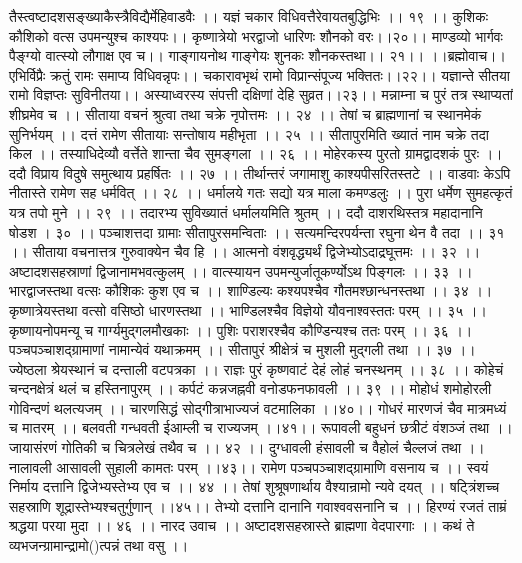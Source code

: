 तैस्त्वष्टादशसङ्ख्याकैस्त्रैविद्यैर्मेहिवाडवैः ।।
यज्ञं चकार विधिवत्तैरेवायतबुद्धिभिः ।। १९ ।।
कुशिकः कौशिको वत्स उपमन्युश्च काश्यपः।।
कृष्णात्रेयो भरद्वाजो धारिणः शौनको वरः।।२०।।
माण्डव्यो भार्गवः पैङ्ग्यो वात्स्यो लौगाक्ष एव च।।
गाङ्गायनोथ गाङ्गेयः शुनकः शौनकस्तथा।। २१।।
।।ब्रह्मोवाच।।
एभिर्विप्रैः क्रतुं रामः समाप्य विधिवन्नृपः।।
चकारावभृथं रामो विप्रान्संपूज्य भक्तितः।।२२।।
यज्ञान्ते सीतया रामो विज्ञप्तः सुविनीतया।।
अस्याध्वरस्य संपत्ती दक्षिणां देहि सुव्रत।।२३।।
मन्नाम्ना च पुरं तत्र स्थाप्यतां शीघ्रमेव च ।।
सीताया वचनं श्रुत्वा तथा चक्रे नृपोत्तमः ।। २४ ।।
तेषां च ब्राह्मणानां च स्थानमेकं सुनिर्भयम् ।।
दत्तं रामेण सीतायाः सन्तोषाय महीभृता ।। २५ ।।
सीतापुरमिति ख्यातं नाम चक्रे तदा किल ।।
तस्याधिदेव्यौ वर्त्तेते शान्ता चैव सुमङ्गला ।। २६ ।।
मोहेरकस्य पुरतो ग्रामद्वादशकं पुरः ।।
ददौ विप्राय विदुषे समुत्थाय प्रहर्षितः ।। २७ ।।
तीर्थान्तरं जगामाशु काश्यपीसरितस्तटे ।।
वाडवाः केऽपि नीतास्ते रामेण सह धर्मवित् ।। २८ ।।
धर्मालये गतः सद्यो यत्र माला कमण्डलुः ।।
पुरा धर्मेण सुमहत्कृतं यत्र तपो मुने ।। २९ ।।
तदारभ्य सुविख्यातं धर्मालयमिति
श्रुतम् ।। ददौ दाशरथिस्तत्र महादानानि षोडश । ३० ।।
पञ्चाशत्तदा ग्रामाः सीतापुरसमन्विताः ।।
सत्यमन्दिरपर्यन्ता रघुना थेन वै तदा ।। ३१ ।।
सीताया वचनात्तत्र गुरुवाक्येन चैव हि ।।
आत्मनो वंशवृद्ध्यर्थं द्विजेभ्योऽदाद्रघूत्तमः ।। ३२ ।।
अष्टादशसहस्राणां द्विजानामभवत्कुलम् ।।
वात्स्यायन उपमन्युर्जातूकर्ण्योऽथ पिङ्गलः ।। ३३ ।।
भारद्वाजस्तथा वत्सः कौशिकः कुश एव च ।।
शाण्डिल्यः कश्यपश्चैव गौतमश्छान्धनस्तथा ।। ३४ ।।
कृष्णात्रेयस्तथा वत्सो वसिष्ठो धारणस्तथा ।।
भाण्डिलश्चैव विज्ञेयो यौवनाश्वस्ततः परम् ।। ३५ ।।
कृष्णायनोपमन्यू च गार्ग्यमुद्गलमौखकाः ।।
पुशिः पराशरश्चैव कौण्डिन्यश्च ततः परम् ।। ३६ ।।
पञ्चपञ्चाशद्ग्रामाणां नामान्येवं यथाक्रमम् ।।
सीतापुरं श्रीक्षेत्रं च मुशली मुद्गली तथा ।। ३७ ।।
ज्येष्ठला श्रेयस्थानं च दन्ताली वटपत्रका ।।
राज्ञः पुरं कृष्णवाटं देहं लोहं चनस्थनम् ।। ३८ ।।
कोहेचं चन्दनक्षेत्रं थलं च हस्तिनापुरम् ।।
कर्पटं कन्नजह्नवी वनोडफनफावली ।। ३९ ।।
मोहोधं शमोहोरली गोविन्दणं थलत्यजम् ।।
चारणसिद्धं सोद्गीत्राभाज्यजं वटमालिका ।।४०।।
गोधरं मारणजं चैव मात्रमध्यं च मातरम् ।।
बलवती गन्धवती ईआम्ली च राज्यजम् ।।४१।।
रूपावली बहुधनं छत्रीटं वंशञ्जं तथा ।।
जायासंरणं गोतिकी च चित्रलेखं तथैव च ।। ४२ ।।
दुग्धावली हंसावली च वैहोलं चैल्लजं तथा ।।
नालावली आसावली सुहाली कामतः परम् ।।४३।।
रामेण पञ्चपञ्चाशद्ग्रामाणि वसनाय च ।।
स्वयं निर्माय दत्तानि द्विजेभ्यस्तेभ्य एव च ।। ४४ ।।
तेषां शुश्रूषणार्थाय वैश्यान्रामो न्यवे दयत् ।।
षट्त्रिंशच्च सहस्राणि शूद्रास्तेभ्यश्चतुर्गुणान् ।।४५।।
तेभ्यो दत्तानि दानानि गवाश्ववसनानि च ।।
हिरण्यं रजतं ताम्रं श्रद्धया परया मुदा ।। ४६ ।।
नारद उवाच ।।
अष्टादशसहस्रास्ते ब्राह्मणा वेदपारगाः ।।
कथं ते व्यभजन्ग्रामान्द्रामो()त्पन्नं तथा वसु ।।
